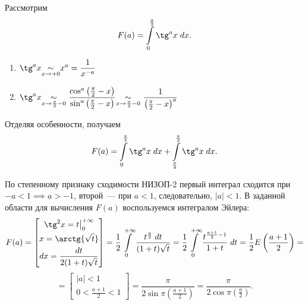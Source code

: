 \documentclass[../../main.tex]{subfiles}
\begin{document}
\begin{example}
	Рассмотрим
	\[  F(a) = \int\limits_{0}^{\frac{\pi}{2}} \tg^a x \; dx. \]
	
	\begin{enumerate}
	 \item $\displaystyle \tg^a x  {\underset{x \to +0}\sim} x^a = \frac{1}{x^{-a}}$
	 
	 \item $\displaystyle \tg^a x {\underset{x \to \frac{\pi}{2} - 0}\sim\ } \frac{\cos^a \left( \frac{\pi}{2} - x\right) }{\sin^a \left( \frac{\pi}{2} - x\right)} {\underset{x \to \frac{\pi}{2} - 0}\sim\ } \frac{1}{\left( \frac{\pi}{2} - x\right)^a }$
	\end{enumerate}
	
	Отделяя особенности, получаем
	\[  F(a) = \int\limits_{0}^{\frac{\pi}{4}} \tg^a x \; dx + \int\limits_{\frac{\pi}{4}}^{\frac{\pi}{2}} \tg^a x \; dx. \]
	
	По степенному признаку сходимости НИЗОП-2 первый интеграл сходится при ${-a < 1} \implies {a > -1}$, второй~--- при $a < 1$, следовательно, $|a| < 1$. В заданной области для вычисления $F(a)$ воспользуемся интегралом Эйлера:
	\[  F(a) = \left[ \begin{gathered}   
	\tg^2 x  = t \big|_{0}^{+\infty}\\
	x = \arctg{\sqrt{t}} \\
	dx = \frac{dt}{2(1+t)\sqrt{t}}
	\end{gathered}\right] = \frac{1}{2} \int\limits_{0}^{+\infty} \frac{ t^{\frac{a}{2}}  \; dt}{(1+t)\sqrt{t}} = \frac{1}{2} \int\limits_{0}^{+\infty} \frac{t^{\frac{a+1}{2} - 1} }{1+t} \; dt = \frac{1}{2}E\left( \frac{a+1}{2} \right) =   \]
	\[ = \left[ \begin{gathered}   
	|a|<1\\
	0 < \frac{a+1}{2} < 1
	\end{gathered}\right] = \frac{\pi}{2\sin{\pi\left( \frac{a+1}{2}\right) }} =  \frac{\pi}{2\cos{\pi\left( \frac{a}{2}\right) }}. \]
\end{example}	
\end{document}
